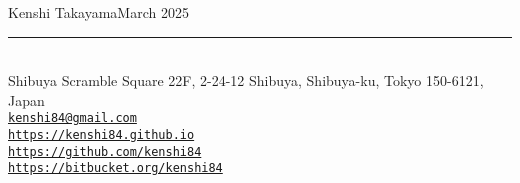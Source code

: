 {\Large\sc Kenshi Takayama}\hfill March 2025
\rule{\textwidth}{1pt}\\
{\small
Shibuya Scramble Square 22F, 2-24-12 Shibuya, Shibuya-ku, Tokyo 150-6121, Japan\\
\href{mailto:kenshi84@gmail.com}{{\tt kenshi84@gmail.com}}\\
\href{https://kenshi84.github.io}{{\tt https://kenshi84.github.io}}\\
\href{https://github.com/kenshi84}{{\tt https://github.com/kenshi84}}\\
\href{https://bitbucket.org/kenshi84}{{\tt https://bitbucket.org/kenshi84}}
}
\vspace{2mm}
